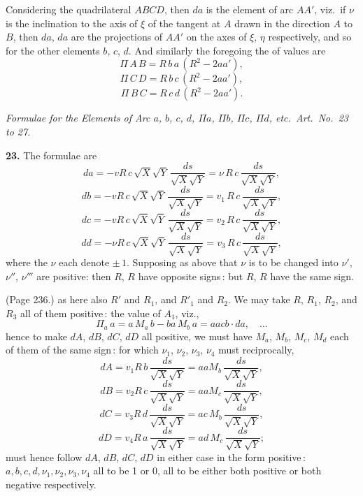 \documentclass[11pt,a4paper]{book}
\begin{document}
Considering the quadrilateral $ABCD$, then $da$ is the element of arc $A A'$, viz.\ if $\nu$ is the inclination to the axis of $\xi$ of the tangent at $A$ drawn in the direction $A$ to $B$, then $d a$, $d a$ are the projections of $A A'$ on the axes of $\xi$, $\eta$ respectively, and so for the other elements $b$, $c$, $d$. And similarly the foregoing the of values are
\[
\Pi\,A\,B = R\,b\,a\,(R^2 - 2 a a'),
\]
\[
\Pi\,C\,D = R\,b\,c\,(R^2 - 2 a a'),
\]
\[
\Pi\,B\,C = R\,c\,d\,(R^2 - 2 a a').
\]

\medskip

\noindent\textit{Formulae for the Elements of Arc $a$, $b$, $c$, $d$, $\Pi a$, $\Pi b$, $\Pi c$, $\Pi d$, etc.\ Art.\ No.\ 23 to 27.}

\medskip

\noindent\textbf{23.} The formulae are
\[
da = - v R\,c\,\sqrt{X}\sqrt{Y}\,\frac{ds}{\sqrt{X}\sqrt{Y}} = \nu\,R\,c\,\frac{ds}{\sqrt{X}\sqrt{Y}},
\]
\[
db = - v R\,c\,\sqrt{X}\sqrt{Y}\,\frac{ds}{\sqrt{X}\sqrt{Y}} = v_1\,R\,c\,\frac{ds}{\sqrt{X}\sqrt{Y}},
\]
\[
dc = - v R\,c\,\sqrt{X}\sqrt{Y}\,\frac{ds}{\sqrt{X}\sqrt{Y}} = v_2\,R\,c\,\frac{ds}{\sqrt{X}\sqrt{Y}},
\]
\[
dd = - \nu R\,c\,\sqrt{X}\sqrt{Y}\,\frac{ds}{\sqrt{X}\sqrt{Y}} = v_3\,R\,c\,\frac{ds}{\sqrt{X}\sqrt{Y}},
\]
where the $\nu$ each denote $\pm\,1$. Supposing as above that $\nu$ is to be changed into $\nu'$, $\nu''$, $\nu'''$ are positive: then $R$, $R$ have opposite signs\,: but $R$, $R$ have the same sign.

\medskip

\noindent (Page 236.) as here also $R'$ and $R_1$, and $R'_1$ and $R_2$. We may take $R$, $R_1$, $R_2$, and $R_3$ all of them positive\,: the value of $A_1$, viz.,
\[
\Pi_a\,a = a\,M_a\,b - b a\,M_b\,a = a a c b \cdot da, \quad \ldots
\]
hence to make $dA$, $dB$, $dC$, $dD$ all positive, we must have $M_a$, $M_b$, $M_c$, $M_d$ each of them of the same sign\,: for which $\nu_1$, $\nu_2$, $\nu_3$, $\nu_4$ must reciprocally,
\[
d A = v_1 R\,b\,\frac{ds}{\sqrt{X}\sqrt{Y}} = a a M_b\,\frac{ds}{\sqrt{X}\sqrt{Y}},
\]
\[
d B = v_2 R\,c\,\frac{ds}{\sqrt{X}\sqrt{Y}} = a a M_c\,\frac{ds}{\sqrt{X}\sqrt{Y}},
\]
\[
d C = v_3 R\,d\,\frac{ds}{\sqrt{X}\sqrt{Y}} = a c\,M_b\,\frac{ds}{\sqrt{X}\sqrt{Y}},
\]
\[
d D = v_4 R\,a\,\frac{ds}{\sqrt{X}\sqrt{Y}} = a d\,M_c\,\frac{ds}{\sqrt{X}\sqrt{Y}};
\]
must hence follow $dA$, $dB$, $dC$, $dD$ in either case in the form positive\,: $a, b, c, d, \nu_1, \nu_2, \nu_3, \nu_4$ all to be 1 or 0, all to be either both positive or both negative respectively.
\end{document}
